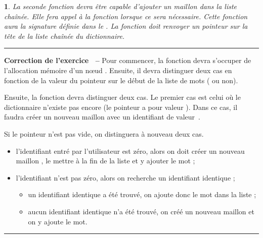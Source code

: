 \documentclass[a4paper]{article}
\newenvironment{Correction}{\par\tiny\blue\rule[1ex]{\textwidth}{1pt}\par\normalsize\textbf{\sffamily{}Correction de l'exercice~\theExo{} -- }}{\par\tiny\blue\rule[1ex]{\textwidth}{1pt}\par}
\newtheorem{Exo}{{\sffamily{Exercice}}}
\begin{document}
\begin{Exo}
					La seconde fonction devra être capable d'ajouter un maillon  dans la liste chaînée.
					Elle fera appel à la fonction  lorsque ce sera nécessaire.
					Cette fonction aura la signature définie dans le .
					La fonction  doit renvoyer un pointeur sur la tête de la liste chaînée du dictionnaire.
				\end{Exo}
				\begin{Correction}
					Pour commencer, la fonction  devra s'occuper de l'allocation mémoire d'un nœud  .
					Ensuite, il devra distinguer deux cas en fonction de la valeur du pointeur sur le début de la liste de mots ( ou non).

					Ensuite, la fonction   devra distinguer deux cas.
					Le premier cas est celui où le dictionnaire n'existe pas encore (le pointeur  a pour valeur ).
					Dans ce cas, il faudra créer un nouveau maillon avec un identifiant de valeur~.

					Si le pointeur n'est pas vide, on distinguera à nouveau deux cas.
					\begin{itemize}
						\item l'identifiant entré par l'utilisateur est zéro, alors on doit créer un nouveau maillon , le mettre à la fin de la liste et y ajouter le mot ;
						\item l'identifiant n'est pas zéro, alors on recherche un identifiant identique ;
						\begin{itemize}
							\item un identifiant identique a été trouvé, on ajoute donc le mot dans la liste ;
							\item aucun identifiant identique n'a été trouvé, on créé un nouveau maillon  et on y ajoute le mot.
						\end{itemize}
					\end{itemize}
				\end{Correction}
\end{document}
